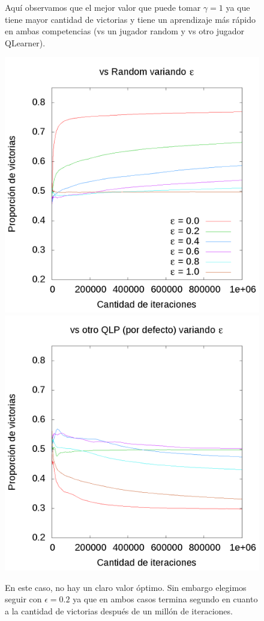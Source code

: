 \documentclass[10pt, a4paper]{article}
\begin{document}
\begin{figure}[H]
\begin{minipage}[c]{1\textwidth}
	\caption{Aquí observamos que el mejor valor que puede tomar $\gamma = 1$ ya que tiene mayor cantidad de victorias y tiene un aprendizaje más rápido en ambas competencias (vs un jugador random y vs otro jugador QLearner).}
  \end{minipage}
\end{figure}
\begin{figure}[H]
  \begin{minipage}[c]{1\textwidth}
	\includegraphics[scale=0.2]{EpsilonR.png}
	\includegraphics[scale=0.2]{EpsilonQ.png}
	\caption{En este caso, no  hay un claro valor óptimo. Sin embargo elegimos seguir con $\epsilon=0.2$ ya que en ambos casos termina segundo en cuanto a la cantidad de victorias después de un millón de iteraciones.}
  \end{minipage}
\end{figure}
\end{document}
